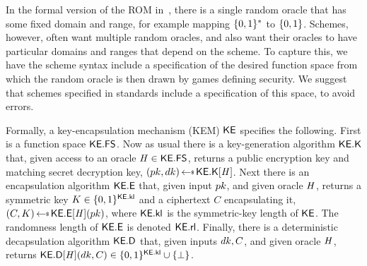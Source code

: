 




 In the formal version of the ROM in~\cite{CCS:BelRog93}, there is a single random oracle that has some fixed domain and range, for example mapping $\{0,1\}^*$ to $\{0,1\}$. Schemes, however, often want multiple random oracles, and also want their oracles to have particular domains and ranges that depend on the scheme. To capture this, we have the scheme syntax include a specification of the desired function space from which the random oracle is then drawn by games defining security. We suggest that schemes specified in standards include a specification of this space, to avoid errors.

Formally, a key-encapsulation mechanism (KEM) ${\mathsf{KE}}$ specifies the following. First is 
a function space $\mathsf{{\mathsf{KE}}.FS}$. Now as usual there is a key-generation algorithm $\mathsf{{\mathsf{KE}}.K}$ that, given access to an oracle $\mathit{H} \in \mathsf{{\mathsf{KE}}.FS}$, returns a public encryption key and matching secret decryption key, $(\pk,\allowbreak \dk)\getsr\kemKg[\aFunc{H}]$. Next there is an encapsulation algorithm $\mathsf{{\mathsf{KE}}.E}$ that, given input $pk$, and given oracle $\mathit{H}$, returns a symmetric key $K \in \{0,1\}^{\mathsf{{\mathsf{KE}}.kl}}$ and a ciphertext $C$ encapsulating it, $(C,K) \getsr\kemEnc[\aFunc{H}](\pk)$, where $\mathsf{{\mathsf{KE}}.kl}$ is the symmetric-key length of ${\mathsf{KE}}$. The randomness length of $\mathsf{{\mathsf{KE}}.E}$ is denoted $\mathsf{{\mathsf{KE}}.rl}$. Finally, there is a deterministic decapsulation algorithm $\mathsf{{\mathsf{KE}}.D}$ that, given inputs $dk,C$, and given oracle $\mathit{H}$, returns $\mathsf{{\mathsf{KE}}.D}[\mathit{H}](dk,C) \allowbreak \in \allowbreak\{0,1\}^{\mathsf{{\mathsf{KE}}.kl}}\cup\{\bot\}$.




